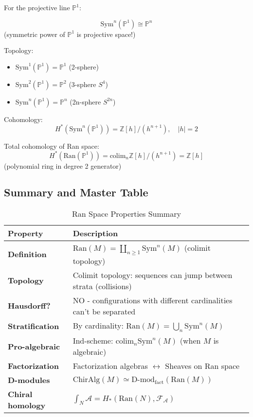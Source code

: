 \begin{example}
\label{ex:ran-P1}
For the projective line $\mathbb{P}^1$:

$$\text{Sym}^n(\mathbb{P}^1) \cong \mathbb{P}^n$$
(symmetric power of $\mathbb{P}^1$ is projective space!)

Topology:
\begin{itemize}
\item $\text{Sym}^1(\mathbb{P}^1) = \mathbb{P}^1$ (2-sphere)
\item $\text{Sym}^2(\mathbb{P}^1) = \mathbb{P}^2$ (3-sphere $S^4$)
\item $\text{Sym}^n(\mathbb{P}^1) = \mathbb{P}^n$ (2n-sphere $S^{2n}$)
\end{itemize}

Cohomology:
$$H^*(\text{Sym}^n(\mathbb{P}^1)) = \mathbb{Z}[h]/(h^{n+1}), \quad |h| = 2$$

Total cohomology of Ran space:
$$H^*(\text{Ran}(\mathbb{P}^1)) = \text{colim}_n \mathbb{Z}[h]/(h^{n+1}) = 
   \mathbb{Z}[h]$$
(polynomial ring in degree 2 generator)
\end{example}

\subsection{Summary and Master Table}

\begin{table}[H]
\centering
\caption{Ran Space Properties Summary}
\begin{tabular}{|l|p{8cm}|}
\hline
\textbf{Property} & \textbf{Description} \\
\hline
\textbf{Definition} & $\text{Ran}(M) = \coprod_{n \geq 1} \text{Sym}^n(M)$ 
   (colimit topology) \\
\hline
\textbf{Topology} & Colimit topology: sequences can jump between strata (collisions) \\
\hline
\textbf{Hausdorff?} & NO - configurations with different cardinalities can't be separated \\
\hline
\textbf{Stratification} & By cardinality: $\text{Ran}(M) = \bigcup_n \text{Sym}^n(M)$ \\
\hline
\textbf{Pro-algebraic} & Ind-scheme: $\text{colim}_n \text{Sym}^n(M)$ (when $M$ is algebraic) \\
\hline
\textbf{Factorization} & Factorization algebras $\leftrightarrow$ Sheaves on Ran space \\
\hline
\textbf{D-modules} & $\text{ChirAlg}(M) \simeq \text{D-mod}_{\text{fact}}(\text{Ran}(M))$ \\
\hline
\textbf{Chiral homology} & $\int_N \mathcal{A} = H_*(\text{Ran}(N), \mathcal{F}_{\mathcal{A}})$ \\
\hline
\end{tabular}
\end{table}

